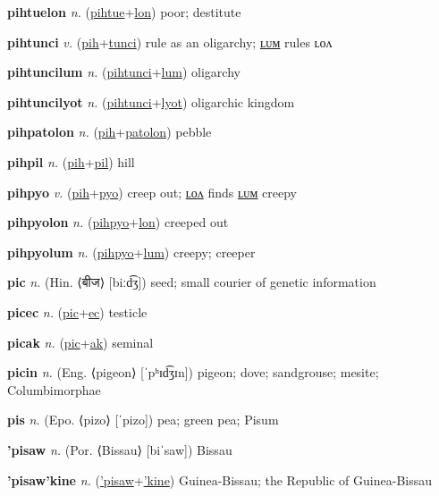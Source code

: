 \textbf{\hypertarget{pihtuelon}{pihtuelon}} \textit{n.} (\hyperlink{pihtue}{pihtue}+\allowbreak \hyperlink{lon}{lon})
poor; destitute

\textbf{\hypertarget{pihtunci}{pihtunci}} \textit{v.} (\hyperlink{pih}{pih}+\allowbreak \hyperlink{tunci}{tunci})
rule as an oligarchy; \hyperlink{pihtuncilum}{ʟᴜᴍ} rules ʟᴏᴧ

\textbf{\hypertarget{pihtuncilum}{pihtuncilum}} \textit{n.} (\hyperlink{pihtunci}{pihtunci}+\allowbreak \hyperlink{lum}{lum})
oligarchy

\textbf{\hypertarget{pihtuncilyot}{pihtuncilyot}} \textit{n.} (\hyperlink{pihtunci}{pihtunci}+\allowbreak \hyperlink{lyot}{lyot})
oligarchic kingdom

\textbf{\hypertarget{pihpatolon}{pihpatolon}} \textit{n.} (\hyperlink{pih}{pih}+\allowbreak \hyperlink{patolon}{patolon})
pebble

\textbf{\hypertarget{pihpil}{pihpil}} \textit{n.} (\hyperlink{pih}{pih}+\allowbreak \hyperlink{pil}{pil})
hill

\textbf{\hypertarget{pihpyo}{pihpyo}} \textit{v.} (\hyperlink{pih}{pih}+\allowbreak \hyperlink{pyo}{pyo})
creep out; \hyperlink{pihpyolon}{ʟᴏᴧ} finds \hyperlink{pihpyolum}{ʟᴜᴍ} creepy

\textbf{\hypertarget{pihpyolon}{pihpyolon}} \textit{n.} (\hyperlink{pihpyo}{pihpyo}+\allowbreak \hyperlink{lon}{lon})
creeped out

\textbf{\hypertarget{pihpyolum}{pihpyolum}} \textit{n.} (\hyperlink{pihpyo}{pihpyo}+\allowbreak \hyperlink{lum}{lum})
creepy; creeper

\textbf{\hypertarget{pic}{pic}} \textit{n.} (Hin. ⟨{\devanagari{}बीज}⟩ [biːd͡ʒ])
seed; small courier of genetic information

\textbf{\hypertarget{picec}{picec}} \textit{n.} (\hyperlink{pic}{pic}+\allowbreak \hyperlink{ec}{ec})
testicle

\textbf{\hypertarget{picak}{picak}} \textit{n.} (\hyperlink{pic}{pic}+\allowbreak \hyperlink{ak}{ak})
seminal

\textbf{\hypertarget{picin}{picin}} \textit{n.} (Eng. ⟨pigeon⟩ [ˈpʰɪd͡ʒɪn])
pigeon; dove; sandgrouse; mesite; Columbimorphae

\textbf{\hypertarget{pis}{pis}} \textit{n.} (Epo. ⟨pizo⟩ [ˈpizo])
pea; green pea; Pisum

\textbf{\hypertarget{'pisaw}{'pisaw}} \textit{n.} (Por. ⟨Bissau⟩ [biˈsaw])
Bissau

\textbf{\hypertarget{'pisaw'kine}{'pisaw'kine}} \textit{n.} (\hyperlink{'pisaw}{'pisaw}+\allowbreak \hyperlink{'kine}{'kine})
Guinea-Bissau; the Republic of Guinea-Bissau

